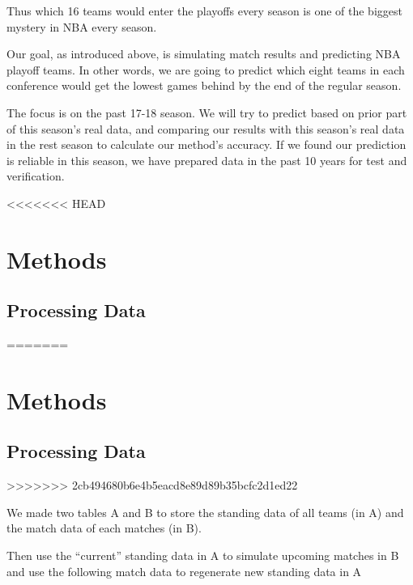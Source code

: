 \documentclass[]{article}
\begin{document}
Thus which 16 teams would enter the playoffs every season is one of the
biggest mystery in NBA every season.

Our goal, as introduced above, is simulating match results and
predicting NBA playoff teams. In other words, we are going to predict
which eight teams in each conference would get the lowest games behind
by the end of the regular season.

The focus is on the past 17-18 season. We will try to predict based on
prior part of this season's real data, and comparing our results with
this season's real data in the rest season to calculate our method's
accuracy. If we found our prediction is reliable in this season, we have
prepared data in the past 10 years for test and verification.

<<<<<<< HEAD
\hypertarget{methods}{%
\section{Methods}\label{methods}}

\hypertarget{processing-data}{%
\subsection{Processing Data}\label{processing-data}}
=======
\section{Methods}\label{methods}

\subsection{Processing Data}\label{processing-data}
>>>>>>> 2cb494680b6e4b5eacd8e89d89b35bcfc2d1ed22

We made two tables A and B to store the standing data of all teams (in
A) and the match data of each matches (in B).

Then use the ``current'' standing data in A to simulate upcoming matches
in B and use the following match data to regenerate new standing data in
A
\end{document}
